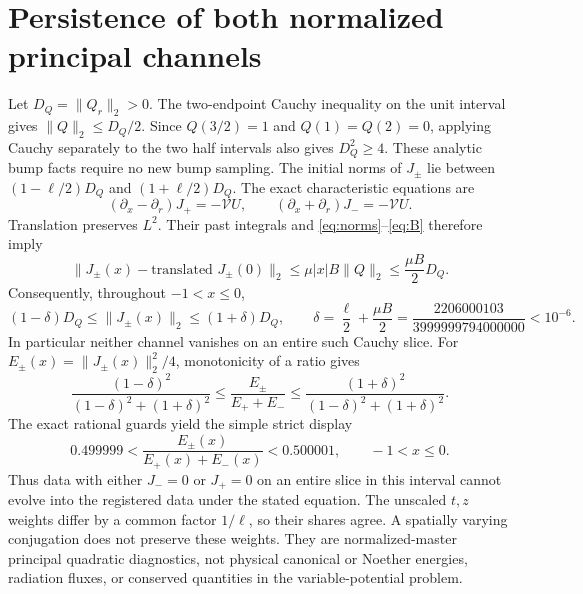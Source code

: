 \documentclass[11pt]{article}
\newcommand{\norm}[1]{\lVert #1\rVert}
\begin{document}
\section{Persistence of both normalized principal channels}
\label{sec:shares}
Let $D_Q=\norm{Q_r}_2>0$. The two-endpoint Cauchy inequality on the
unit interval gives $\norm{Q}_2\le D_Q/2$.
Since $Q(3/2)=1$ and $Q(1)=Q(2)=0$, applying Cauchy separately to the
two half intervals also gives $D_Q^2\ge4$.
These analytic bump facts require no new bump sampling.
The initial norms of $J_\pm$ lie between
$(1-\ell/2)D_Q$ and $(1+\ell/2)D_Q$.
The exact characteristic equations are
\begin{equation}
 (\partial_x-\partial_r)J_+=-\mathcal VU,\qquad
 (\partial_x+\partial_r)J_-=-\mathcal VU.
 \label{eq:char}
\end{equation}
Translation preserves $L^2$. Their past integrals and
\eqref{eq:norms}--\eqref{eq:B} therefore imply
\[
 \norm{J_\pm(x)-\text{translated }J_\pm(0)}_2
 \le\mu|x|B\norm{Q}_2\le\frac{\mu B}{2}D_Q .
\]
Consequently, throughout $-1<x\le0$,
\begin{equation}
 (1-\delta)D_Q\le\norm{J_\pm(x)}_2\le(1+\delta)D_Q,\qquad
 \delta=\frac\ell2+\frac{\mu B}{2}
       =\frac{2206000103}{3999999794000000}<10^{-6}.
 \label{eq:delta}
\end{equation}
In particular neither channel vanishes on an entire such Cauchy slice.
For
$E_\pm(x)=\norm{J_\pm(x)}_2^2/4$, monotonicity of a ratio gives
\begin{equation}
 \frac{(1-\delta)^2}{(1-\delta)^2+(1+\delta)^2}
 \le\frac{E_\pm}{E_++E_-}\le
 \frac{(1+\delta)^2}{(1-\delta)^2+(1+\delta)^2}.
 \label{eq:ratio}
\end{equation}
The exact rational guards yield the simple strict display
\begin{equation}
 0.499999<\frac{E_\pm(x)}{E_+(x)+E_-(x)}<0.500001,
 \qquad -1<x\le0 .
 \label{eq:shares}
\end{equation}
Thus data with either $J_-=0$ or $J_+=0$ on an entire slice in this
interval cannot evolve into the registered data under the stated equation.
The unscaled $t,z$ weights differ by a common factor $1/\ell$, so their
shares agree. A spatially varying conjugation does not preserve these
weights. They are normalized-master principal quadratic diagnostics,
not physical canonical or Noether energies, radiation fluxes, or
conserved quantities in the variable-potential problem.
\end{document}
